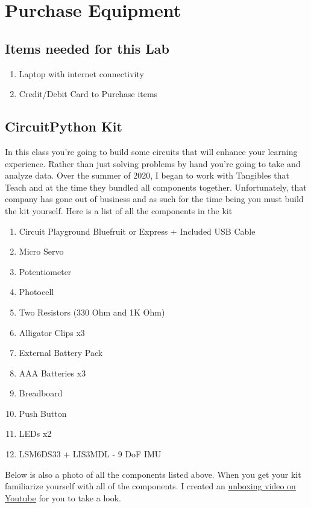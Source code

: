 \newpage

\section{Purchase Equipment}

\subsection{Items needed for this Lab}

\begin{enumerate}[itemsep=-5pt]
\item Laptop with internet connectivity
\item Credit/Debit Card to Purchase items
\end{enumerate}

\subsection{CircuitPython Kit}

In this class you’re going to build some circuits that will enhance
your learning experience. Rather than just solving problems by hand
you’re going to take and analyze data. Over the summer of 2020, I
began to work with Tangibles that Teach and at the time they bundled
all components together. Unfortunately, that company has gone out of
business and as such for the time being you must build the kit
yourself. Here is a list of all the components in the kit

\begin{enumerate}[itemsep=-5pt]
\item Circuit Playground Bluefruit or Express + Included USB Cable
\item Micro Servo
\item Potentiometer
\item Photocell
\item Two Resistors (330 Ohm and 1K Ohm)
\item Alligator Clips x3
\item External Battery Pack
\item AAA Batteries x3
\item Breadboard
\item Push Button 
\item LEDs x2
\item LSM6DS33 + LIS3MDL - 9 DoF IMU
\end{enumerate}

Below is also a photo of all the components listed above. When you get
your kit familiarize yourself with all of the components. I created
an \href{https://youtu.be/6sNNQrhnzLE}{unboxing video on Youtube} 
for you to take a look. 

